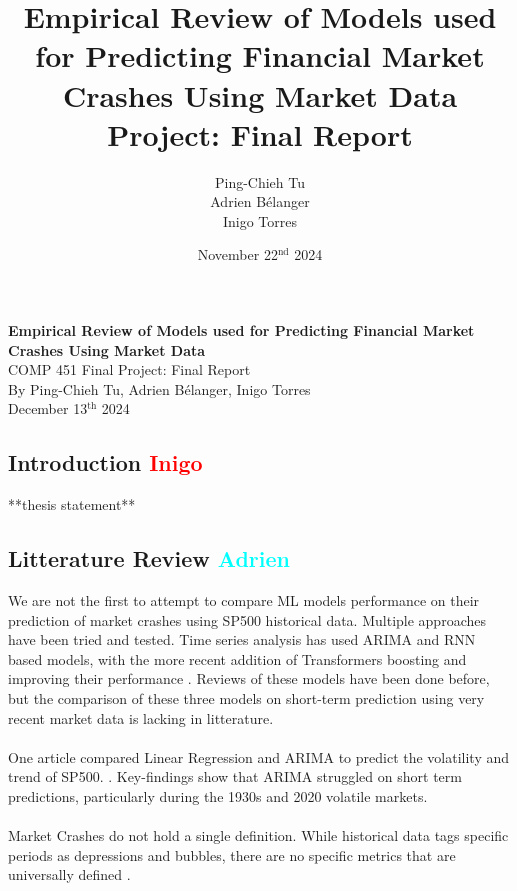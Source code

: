 \documentclass[12pt, letterpaper]{article}
\title{
    Empirical Review of Models used for Predicting Financial Market Crashes Using Market Data 
    \vspace{1em} \\
    {\large Project: Final Report}
}
\author{\normalsize Ping-Chieh Tu \\ Adrien Bélanger \\ Inigo Torres}
\date{\vspace{2em} November 22$^{\text{nd}}$ 2024}
\begin{document}
\begin{titlepage}
    \centering
    \vspace*{2in}
    {\LARGE \textbf{Empirical Review of Models used for Predicting Financial Market Crashes Using Market Data}}\\
    \vspace*{0.5in}
    {\large COMP 451 Final Project: Final Report}\\[4in]
    \normalsize
    By Ping-Chieh Tu, Adrien Bélanger, Inigo Torres \\ [3em]
    December 13$^{\text{th}}$ 2024
\end{titlepage}
\pagebreak

\subsection*{Introduction \textcolor{red}{Inigo}}

**thesis statement**



\subsection*{Litterature Review \textcolor{cyan}{Adrien}}
    We are not the first to attempt to compare ML models performance on their prediction of market crashes using SP500 historical data. Multiple approaches have been tried and tested. Time series analysis has used ARIMA and RNN based models, with the more recent addition of Transformers boosting and improving their performance  \cite{Okpeke, Ahmed, ArunKumar}. Reviews of these models have been done before, but the comparison of these three models on short-term prediction using very recent market data is lacking in litterature. 
    \paragraph*{}
    One article compared Linear Regression and ARIMA to predict the volatility and trend of SP500. \cite{sp500arimalstmregression}. 
    Key-findings show that ARIMA struggled on short term predictions, particularly during the 1930s and 2020 volatile markets. 
    \paragraph*{}
    Market Crashes do not hold a single definition. While historical data tags specific periods as depressions and bubbles, there are no specific metrics that are universally defined \cite{Fonville, Investo}. 
\end{document}
